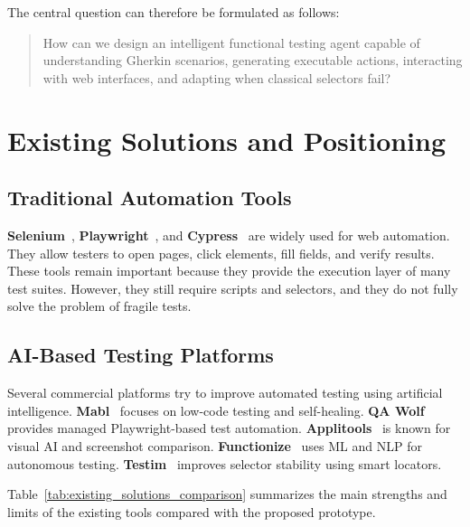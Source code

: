 The central question can therefore be formulated as follows:

\begin{quote}
	How can we design an intelligent functional testing agent capable of understanding Gherkin scenarios, generating executable actions, interacting with web interfaces, and adapting when classical selectors fail?
\end{quote}

\section{Existing Solutions and Positioning}
\label{sec:existing_solutions_positioning}

\subsection{Traditional Automation Tools}
\label{subsec:traditional_automation}

\textbf{Selenium}~\cite{selenium_docs}, \textbf{Playwright}~\cite{playwright_docs}, and \textbf{Cypress}~\cite{cypress_docs} are widely used for web automation. They allow testers to open pages, click elements, fill fields, and verify results. These tools remain important because they provide the execution layer of many test suites. However, they still require scripts and selectors, and they do not fully solve the problem of fragile tests.

\subsection{AI-Based Testing Platforms}
\label{subsec:ai_testing_platforms}

Several commercial platforms try to improve automated testing using artificial intelligence. \textbf{Mabl}~\cite{mabl_platform} focuses on low-code testing and self-healing. \textbf{QA Wolf}~\cite{qawolf_platform} provides managed Playwright-based test automation. \textbf{Applitools}~\cite{applitools_platform} is known for visual AI and screenshot comparison. \textbf{Functionize}~\cite{functionize_platform} uses ML and NLP for autonomous testing. \textbf{Testim}~\cite{testim_platform} improves selector stability using smart locators.

Table~\ref{tab:existing_solutions_comparison} summarizes the main strengths and limits of the existing tools compared with the proposed prototype.

